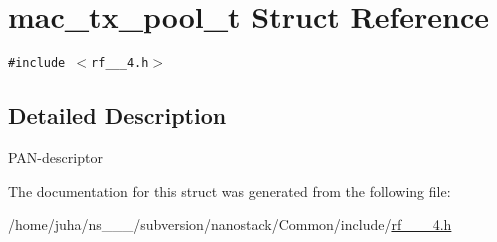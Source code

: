 \hypertarget{structmac__tx__pool__t}{
\section{mac\_\-tx\_\-pool\_\-t Struct Reference}
\label{structmac__tx__pool__t}
}
{\tt \#include $<$rf\_\_\_\-4.h$>$}



\subsection{Detailed Description}
PAN-descriptor 



The documentation for this struct was generated from the following file:\begin{CompactItemize}
\item 
/home/juha/ns\_\_\_/subversion/nanostack/Common/include/\hyperlink{rf__802__15__4_8h}{rf\_\_\_\-4.h}\end{CompactItemize}
